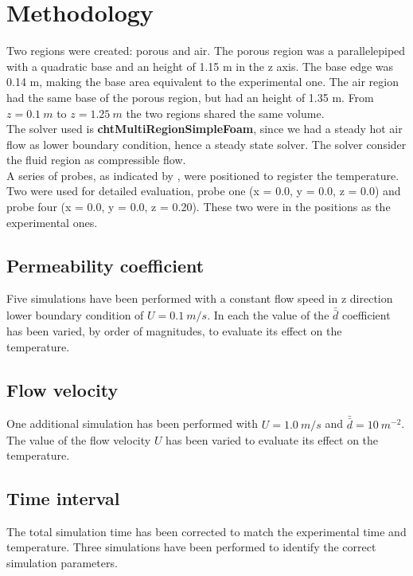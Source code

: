 
\section{Methodology}
\label{section:methodology}

Two regions were created: porous and air.
The porous region was a parallelepiped with a quadratic base and an height of
1.15 m in the z axis. The base edge was 0.14 m, making the base area
equivalent to the experimental one.
The air region had the same base of the porous region, but had an height of
1.35 m.
From $z=0.1 ~m$ to $z=1.25 ~m$ the two regions shared the same volume.\\
The solver used is \textbf{chtMultiRegionSimpleFoam}, since we had a steady hot
air flow as lower boundary condition, hence a steady state solver.
The solver consider the fluid region as compressible flow.\\
A series of probes, as indicated by \textcite{RegionProbe}, were positioned to
register the temperature.
Two were used for detailed evaluation, probe one (x = 0.0, y = 0.0, z = 0.0) and
probe four (x = 0.0, y = 0.0, z = 0.20). These two were in the positions as the
experimental ones.

\subsection{Permeability coefficient}
\label{subsection:permeabilitycoefficient}

Five simulations have been performed with a constant flow speed in z
direction lower boundary condition of $U = 0.1 ~m/s$.
In each the value of the $\bar{\bar{d}}$ coefficient has been varied, by order
of magnitudes, to evaluate its effect on the temperature.

\subsection{Flow velocity}
\label{subsection:flowvelocity}

One additional simulation has been performed with $U = 1.0 ~m/s$ and
$\bar{\bar{d}} = 10 ~m^{-2}$.
The value of the flow velocity $U$ has been varied to
evaluate its effect on the temperature.

\subsection{Time interval}
\label{subsection:timeinterval}

The total simulation time has been corrected to match the experimental time and
temperature.
Three simulations have been performed to identify the correct simulation
parameters.

